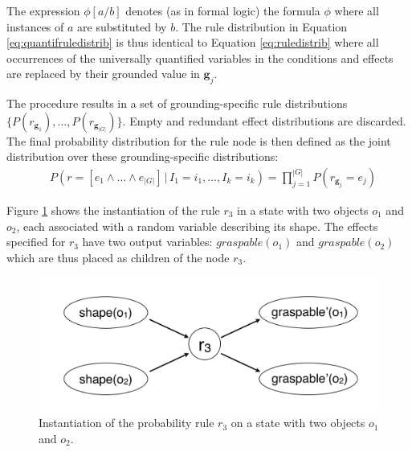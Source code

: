 The expression $\phi[a/b]$ denotes (as in formal logic) the formula $\phi$ where all instances of $a$ are substituted by $b$. The rule distribution in Equation \eqref{eq:quantifruledistrib} is thus identical to Equation \eqref{eq:ruledistrib} where all occurrences of the universally quantified variables in the conditions and effects are replaced by their grounded value in $\mathbf{g}_j$.

The procedure results in a set of grounding-specific rule distributions $ \{ P(r_{\mathbf{g}_1}), \dots, P(r_{\mathbf{g}_{|G|}}) \}$. Empty and redundant effect distributions are discarded. The final probability distribution for the rule node is then defined as the joint distribution over these grounding-specific distributions: 
\begin{align}
& P(r\!=\![e_1 \land \dots \land e_{|G|}] \, | \, I_1\!=\!i_1, \dots, I_k\!=\!i_k) = \prod_{j=1}^{|G|} P(r_{\mathbf{g}_j}\!=\!e_j) \label{eq:quantifruledistrib2}
\end{align}


Figure \ref{fig:quantinstantitionprob} shows the instantiation of the rule $r_3$ in a state with two objects $o_1$ and $o_2$, each associated with a random variable describing its shape. The effects specified for $r_3$ have two output variables: $\mathit{graspable}(o_1)$ and $\mathit{graspable}(o_2)$ which are thus placed as children of the node $r_3$.  

\begin{figure}[ht]
\centering
\includegraphics[scale=0.25]{imgs/quantruleinstantiation.pdf}
\caption{Instantiation of the probability rule $r_3$ on a state with two objects $o_1$ and $o_2$.}
\label{fig:quantinstantitionprob}
\end{figure}

